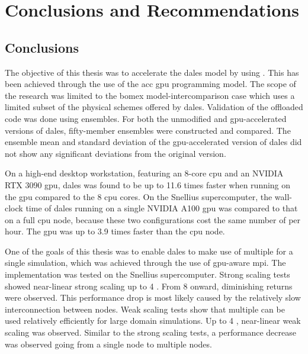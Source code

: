 \chapter{Conclusions and Recommendations} \label{chap:conclusion_rec}

\section{Conclusions}
The objective of this thesis was to accelerate the \acrshort{dales} model by using . This has been achieved through the use of the \acrshort{acc} \acrshort{gpu} programming model. The scope of the research was limited to the \acrshort{bomex} model-intercomparison case which uses a limited subset of the physical schemes offered by \acrshort{dales}. Validation of the offloaded code was done using ensembles. For both the unmodified and \acrshort{gpu}-accelerated versions of \acrshort{dales}, fifty-member ensembles were constructed and compared. The ensemble mean and standard deviation of the \acrshort{gpu}-accelerated version of \acrshort{dales} did not show any significant deviations from the original version.

On a high-end desktop workstation, featuring an 8-core \acrshort{cpu} and an NVIDIA RTX 3090 \acrshort{gpu}, \acrshort{dales} was found to be up to 11.6 times faster when running on the \acrshort{gpu} compared to the 8 \acrshort{cpu} cores. On the Snellius supercomputer, the wall-clock time of \acrshort{dales} running on a single NVIDIA A100 \acrshort{gpu} was compared to that on a full \acrshort{cpu} node, because these two configurations cost the same number of  per hour. The \acrshort{gpu} was up to 3.9 times faster than the \acrshort{cpu} node. 

One of the goals of this thesis was to enable \acrshort{dales} to make use of multiple  for a single simulation, which was achieved through the use of \acrshort{gpu}-aware \acrshort{mpi}. The implementation was tested on the Snellius supercomputer. Strong scaling tests showed near-linear strong scaling up to 4 . From 8  onward, diminishing returns were observed. This performance drop is most likely caused by the relatively slow interconnection between nodes. Weak scaling tests show that multiple  can be used relatively efficiently for large domain simulations. Up to 4 , near-linear weak scaling was observed. Similar to the strong scaling tests, a performance decrease was observed going from a single node to multiple nodes.

